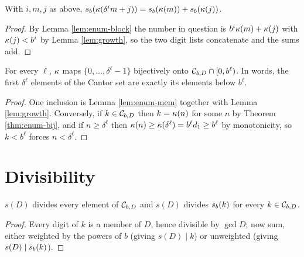 \begin{lemma}
  \label{lem:sumDigits-enum-block}
  \leanok
  With $i, m, j$ as above,
  $s_b(\kappa(\delta^i m + j)) = s_b(\kappa(m)) + s_b(\kappa(j))$.
\end{lemma}
\begin{proof}
  \leanok
  By Lemma \ref{lem:enum-block} the number in question is
  $b^i \kappa(m) + \kappa(j)$ with $\kappa(j) < b^i$ by Lemma
  \ref{lem:growth}, so the two digit lists concatenate and the sums add.
\end{proof}

\begin{lemma}
  \label{lem:enum-initial}
  \leanok
  For every $\ell$, $\kappa$ maps $\{0, \ldots, \delta^\ell - 1\}$ bijectively
  onto $\mathcal{C}_{b,D} \cap [0, b^\ell)$. In words, the first $\delta^\ell$ elements of
  the Cantor set are exactly its elements below $b^\ell$.
\end{lemma}
\begin{proof}
  \leanok
  One inclusion is Lemma \ref{lem:enum-mem} together with
  Lemma \ref{lem:growth}.  Conversely, if $k \in \mathcal{C}_{b,D}$ then $k = \kappa(n)$
  for some $n$ by Theorem \ref{thm:enum-bij}, and if $n \geq \delta^\ell$
  then $\kappa(n) \geq \kappa(\delta^\ell) = b^\ell d_1 \geq b^\ell$ by
  monotonicity, so $k < b^\ell$ forces $n < \delta^\ell$.
\end{proof}

\section{Divisibility}

\begin{lemma}
  \label{lem:stepSize-dvd}
  \leanok
  $s(D)$ divides every element of $\mathcal{C}_{b,D}$ and $s(D)$ divides $s_b(k)$ for every
  $k \in \mathcal{C}_{b,D}$.
\end{lemma}
\begin{proof}
  \leanok
  Every digit of $k$ is a member of $D$, hence divisible by $\gcd D$; now sum,
  either weighted by the powers of $b$ (giving $s(D) \mid k$) or unweighted
  (giving $s(D) \mid s_b(k)$).
\end{proof}

